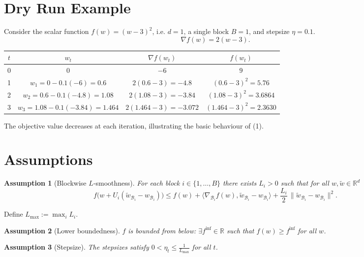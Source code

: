 \documentclass{article}
\newtheorem{assumption}{Assumption}
\begin{document}
\section*{Dry Run Example}
Consider the scalar function $f(w)=(w-3)^{2}$, i.e. $d=1$, a single block $B=1$, and stepsize $\eta=0.1$.
\[
\nabla f(w)=2(w-3).
\]

\begin{center}
\begin{tabular}{c|c|c|c}
$t$ & $w_{t}$ & $\nabla f(w_{t})$ & $f(w_{t})$ \\ \hline
0 & $0$ & $-6$ & $9$ \\
1 & $w_{1}=0-0.1(-6)=0.6$ & $2(0.6-3)=-4.8$ & $(0.6-3)^{2}=5.76$ \\
2 & $w_{2}=0.6-0.1(-4.8)=1.08$ & $2(1.08-3)=-3.84$ & $(1.08-3)^{2}=3.6864$ \\
3 & $w_{3}=1.08-0.1(-3.84)=1.464$ & $2(1.464-3)=-3.072$ & $(1.464-3)^{2}=2.3630$
\end{tabular}
\end{center}
The objective value decreases at each iteration, illustrating the basic behaviour of (1).

\newpage
\section*{Assumptions}
\begin{assumption}[Blockwise $L$‑smoothness]\label{ass:Lsmooth}
For each block $i\in\{1,\dots ,B\}$ there exists $L_{i}>0$ such that for all $w,\tilde w\in\mathbb{R}^{d}$
\[
f\bigl(w+U_{i}( \tilde w_{\mathcal{B}_{i}}-w_{\mathcal{B}_{i}})\bigr)
\le f(w) + \langle \nabla_{\mathcal{B}_{i}}f(w),\tilde w_{\mathcal{B}_{i}}-w_{\mathcal{B}_{i}}\rangle
   + \frac{L_{i}}{2}\,\bigl\|\tilde w_{\mathcal{B}_{i}}-w_{\mathcal{B}_{i}}\bigr\|^{2}.
\]
\end{assumption}
Define $L_{\max}:=\max_{i}L_{i}$.

\begin{assumption}[Lower boundedness]\label{ass:lower}
$f$ is bounded from below: $\exists f^{\inf}\in\mathbb{R}$ such that $f(w)\ge f^{\inf}$ for all $w$.
\end{assumption}

\begin{assumption}[Stepsize]\label{ass:stepsize}
The stepsizes satisfy $0<\eta_{t}\le \frac{1}{L_{\max}}$ for all $t$.
\end{assumption}
\end{document}
